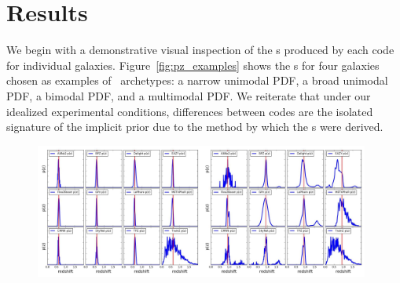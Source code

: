 \section{Results}
\label{sec:results}

We begin with a demonstrative visual inspection of the \pzpdf s produced by each code for individual galaxies.
Figure~\ref{fig:pz_examples} shows the \pzpdf s for four galaxies chosen as examples of \pzpdf\ archetypes: a narrow unimodal PDF, a broad unimodal PDF, a bimodal PDF, and a multimodal PDF.
We reiterate that under our idealized experimental conditions, differences between codes are the isolated signature of the implicit prior due to the method by which the \pzpdf s were derived.

\begin{figure}
\includegraphics[width=0.49\textwidth]{fig/pz_12codes_261931_noseaborn_crop.jpg}\includegraphics[width=0.49\textwidth]{fig/pz_12codes_471167_noseaborn_crop.jpg}\\

\end{figure}
